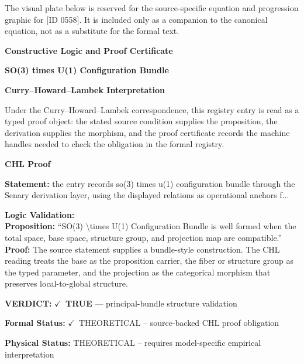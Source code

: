 \begingroup\footnotesize\sloppy
The visual plate below is reserved for the source-specific equation and progression graphic for [ID 0558]. It is included only as a companion to the canonical equation, not as a substitute for the formal text.
\par\endgroup
\ifTZPDarkEdition
{}
\fi

\clearpage
\begingroup\tzpsupportsetup
\noindent\textbf{\fontsize{10.8pt}{12.8pt}\selectfont [ID 0558] Constructive Logic and Proof Certificate}\par
\noindent\textbf{\fontsize{10pt}{12pt}\selectfont SO(3) times U(1) Configuration Bundle}\par
\vspace{0.45em}
\begingroup
\footnotesize
\setlength{\parskip}{0.22em}
\setlength{\parindent}{0pt}
\noindent\textbf{Curry--Howard--Lambek Interpretation}\par
Under the Curry--Howard--Lambek correspondence, this registry entry is read as a typed proof
object: the stated source condition supplies the proposition, the derivation supplies the
morphism, and the proof certificate records the machine handles needed to check the obligation
in the formal registry.

\vspace{0.45em}
\noindent\textbf{CHL Proof}\par
\textbf{Statement:} the entry records so(3) times u(1) configuration bundle through the Senary derivation
layer, using the displayed relations as operational anchors f...

\textbf{Logic Validation:}\\
\textbf{Proposition:} ``SO(3) \textbackslash{}times U(1) Configuration Bundle is well formed when the total space, base
space, structure group, and projection map are compatible.''\\
\textbf{Proof:} The source statement supplies a bundle-style construction. The CHL reading treats the
base as the proposition carrier, the fiber or structure group as the typed parameter,
and the projection as the categorical morphism that preserves local-to-global structure.

\textbf{VERDICT:} \ensuremath{\checkmark}\ \textbf{TRUE} --- principal-bundle structure validation

\textbf{Formal Status:} \ensuremath{\checkmark}\ THEORETICAL -- source-backed CHL proof obligation

\textbf{Physical Status:} THEORETICAL -- requires model-specific empirical interpretation
\par\vspace{0.45em}
\par
\ifTZPDarkEdition
{}
\fi
\endgroup
\endgroup

